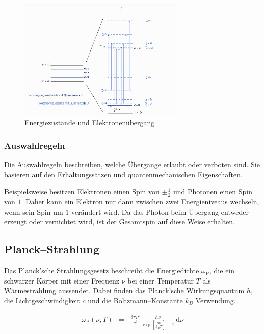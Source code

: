 \documentclass[12pt,a4paper]{scrartcl}
\numberwithin{equation}{section} %
\begin{document}
\begin{figure}[h!]
	\centering
	\includegraphics[width=0.7\textwidth]{../media/B1.1/Uebergaenge.jpg}
	\caption{Energiezustände und Elektronenübergang \cite{Agilent Technologies}}
	\label{abb:Übergänge}
\end{figure}

\subsubsection{Auswahlregeln}
Die Auswahlregeln beschreiben, welche Übergänge erlaubt oder verboten sind. Sie basieren auf den Erhaltungssätzen und quantenmechanischen Eigenschaften.

Beispielsweise besitzen Elektronen einen Spin von $\pm\frac{1}{2}$ und Photonen einen Spin von $1$. Daher kann ein Elektron nur dann zwischen zwei Energieniveaus wechseln, wenn sein Spin um $1$ verändert wird. Da das Photon beim Übergang entweder erzeugt oder vernichtet wird, ist der Gesamtspin auf diese Weise erhalten.

\hypertarget{planckstrahlung}{%
\subsection{Planck--Strahlung}\label{planckstrahlung}}

Das Planck'sche Strahlungsgesetz beschreibt die Energiedichte $\omega_\mathrm{P}$, die ein schwarzer Körper mit einer Frequenz $\nu$ bei einer Temperatur $T$ als Wärmestrahlung aussendet. Dabei finden das Planck'sche Wirkungsquantum $h$, die Lichtgeschwindigkeit $c$ und die Boltzmann--Konstante $k_B$ Verwendung. \cite{Demtröder Atom}

\begin{eqnarray}
    \omega_\mathrm{P}(\nu,T) &=&
        \frac{8\pi\nu^2}{c^3}
        \frac{h\nu}{\exp\left[\frac{h\nu}{k_BT}\right]-1}
        \,\mathrm d\nu
        \label{eq:PlackStrahlung}
\end{eqnarray}
\end{document}
